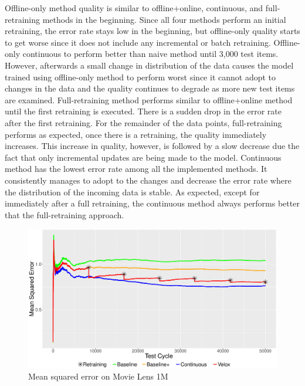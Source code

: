 \documentclass{vldb}
\begin{document}
Offline-only method quality is similar to offline+online, continuous, and full-retraining methods in the beginning. 
Since all four methods perform an initial retraining, the error rate stays low in the beginning, but offline-only quality starts to get worse since it does not include any incremental or batch retraining.
Offline-only continuous to perform better than naive method until 3,000 test items.
However, afterwards a small change in distribution of the data causes the model trained using offline-only method to perform worst since it cannot adopt to changes in the data and the quality continues to degrade as more new test items are examined.
Full-retraining method performs similar to offline+online method until the first retraining is executed.
There is a sudden drop in the error rate after the first retraining.
For the remainder of the data points, full-retraining performs as expected, once there is a retraining, the quality immediately increases.
This increase in quality, however, is followed by a slow decrease due the fact that only incremental updates are being made to the model.
Continuous method has the lowest error rate among all the implemented methods.
It consistently manages to adopt to the changes and decrease the error rate where the distribution of the incoming data is stable.
As expected, except for immediately after a full retraining, the continuous method always performs better that the full-retraining approach.

\begin{figure}[h]
\centering
\includegraphics[width=\columnwidth]{../images/experiment-results/movie-lens-1m-quality-improved.eps}
\caption{Mean squared error on Movie Lens 1M}
\label{fig:movie-lens-1M-score}
\end{figure}
\end{document}
